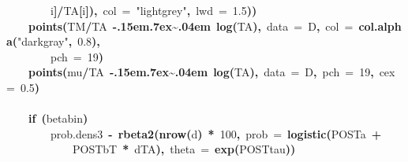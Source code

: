 \documentclass{article}
\makeatletter
\newcommand{\hlnumber}[1]{\textcolor[rgb]{0,0,0}{#1}}%
\newcommand{\hlfunctioncall}[1]{\textcolor[rgb]{.5,0,.33}{\textbf{#1}}}%
\newcommand{\hlstring}[1]{\textcolor[rgb]{.6,.6,1}{#1}}%
\newcommand{\hlkeyword}[1]{\textbf{#1}}%
\newcommand{\hlargument}[1]{\textcolor[rgb]{.69,.25,.02}{#1}}%
\newcommand{\hlassignement}[1]{\textbf{#1}}%
\newcommand{\hlsymbol}[1]{#1}%
\def\urltilda{\kern -.15em\lower .7ex\hbox{\~{}}\kern .04em}%
\newcommand{\hlstd}[1]{\textcolor[rgb]{0,0,0}{#1}}%
\newenvironment{kframe}{%
 \def\FrameCommand##1{\hskip\@totalleftmargin \hskip-\fboxsep
 \colorbox{shadecolor}{##1}\hskip-\fboxsep
     \hskip-\linewidth \hskip-\@totalleftmargin \hskip\columnwidth}%
 \MakeFramed {\advance\hsize-\width
   \@totalleftmargin\z@ \linewidth\hsize
   \@setminipage}}%
 {\par\unskip\endMakeFramed}
\newenvironment{knitrout}{}{} %
\makeatother
\begin{document}
\begin{knitrout}
{\begin{kframe}
\begin{flushleft}
\hlstd{}{\ }{\ }{\ }{\ }{\ }{\ }{\ }{\ }\hlsymbol{i}\hlkeyword{]}\hlkeyword{/}\hlsymbol{TA}\hlkeyword{[}\hlsymbol{i}\hlkeyword{]}\hlkeyword{)}\hlkeyword{,}{\ }\hlargument{col}{\ }\hlargument{=}{\ }\hlstring{"lightgrey"}\hlkeyword{,}{\ }\hlargument{lwd}{\ }\hlargument{=}{\ }\hlnumber{1.5}\hlkeyword{)}\hlkeyword{)}\hspace*{\fill}\\
\hlstd{}{\ }{\ }{\ }{\ }\hlfunctioncall{points}\hlkeyword{(}\hlsymbol{TM}\hlkeyword{/}\hlsymbol{TA}{\ }\hlkeyword{\urltilda{}}{\ }\hlfunctioncall{log}\hlkeyword{(}\hlsymbol{TA}\hlkeyword{)}\hlkeyword{,}{\ }\hlargument{data}{\ }\hlargument{=}{\ }\hlsymbol{D}\hlkeyword{,}{\ }\hlargument{col}{\ }\hlargument{=}{\ }\hlfunctioncall{col.alpha}\hlkeyword{(}\hlstring{"darkgray"}\hlkeyword{,}{\ }\hlnumber{0.8}\hlkeyword{)}\hlkeyword{,}\hspace*{\fill}\\
\hlstd{}{\ }{\ }{\ }{\ }{\ }{\ }{\ }{\ }\hlargument{pch}{\ }\hlargument{=}{\ }\hlnumber{19}\hlkeyword{)}\hspace*{\fill}\\
\hlstd{}{\ }{\ }{\ }{\ }\hlfunctioncall{points}\hlkeyword{(}\hlsymbol{mu}\hlkeyword{/}\hlsymbol{TA}{\ }\hlkeyword{\urltilda{}}{\ }\hlfunctioncall{log}\hlkeyword{(}\hlsymbol{TA}\hlkeyword{)}\hlkeyword{,}{\ }\hlargument{data}{\ }\hlargument{=}{\ }\hlsymbol{D}\hlkeyword{,}{\ }\hlargument{pch}{\ }\hlargument{=}{\ }\hlnumber{19}\hlkeyword{,}{\ }\hlargument{cex}{\ }\hlargument{=}{\ }\hlnumber{0.5}\hlkeyword{)}\hspace*{\fill}\\
\hlstd{}\hspace*{\fill}\\
\hlstd{}{\ }{\ }{\ }{\ }\hlkeyword{if}{\ }\hlkeyword{(}\hlsymbol{betabin}\hlkeyword{)}{\ }\hlkeyword{\usebox{\hlnormalsizeboxopenbrace}}\hspace*{\fill}\\
\hlstd{}{\ }{\ }{\ }{\ }{\ }{\ }{\ }{\ }\hlsymbol{prob.dens3}{\ }\hlassignement{\usebox{\hlnormalsizeboxlessthan}-}{\ }\hlfunctioncall{rbeta2}\hlkeyword{(}\hlfunctioncall{nrow}\hlkeyword{(}\hlsymbol{d}\hlkeyword{)}{\ }\hlkeyword{*}{\ }\hlnumber{100}\hlkeyword{,}{\ }\hlargument{prob}{\ }\hlargument{=}{\ }\hlfunctioncall{logistic}\hlkeyword{(}\hlsymbol{POST}\hlkeyword{\usebox{\hlnormalsizeboxdollar}}\hlsymbol{a}{\ }\hlkeyword{+}\hspace*{\fill}\\
\hlstd{}{\ }{\ }{\ }{\ }{\ }{\ }{\ }{\ }{\ }{\ }{\ }{\ }\hlsymbol{POST}\hlkeyword{\usebox{\hlnormalsizeboxdollar}}\hlsymbol{bT}{\ }\hlkeyword{*}{\ }\hlsymbol{d}\hlkeyword{\usebox{\hlnormalsizeboxdollar}}\hlsymbol{TA}\hlkeyword{)}\hlkeyword{,}{\ }\hlargument{theta}{\ }\hlargument{=}{\ }\hlfunctioncall{exp}\hlkeyword{(}\hlsymbol{POST}\hlkeyword{\usebox{\hlnormalsizeboxdollar}}\hlsymbol{tau}\hlkeyword{)}\hlkeyword{)}\hspace*{\fill}\\

\end{flushleft}
\end{kframe}}
\end{knitrout}
\end{document}
